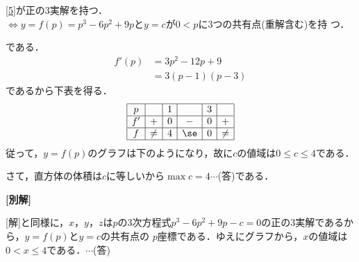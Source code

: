 \documentclass[a4j]{jarticle}
\begin{document}
\begin{multicols}{2}
\begin{enumerate}[(i)]
\begin{center}
          \eqref{5}が正の$3$実解を持つ．\\
          $\Longleftrightarrow$$y=f(p)=p^3-6p^2+9p$と$y=c$が$0<p$に$3$つの共有点(重解含む)を持
          つ．
          \end{center}
     である．
          \begin{align*}
          f'(p)&=3p^2-12p+9  \\
          &=3(p-1)(p-3)
          \end{align*}
     であるから下表を得る．
          \begin{align*}
               \begin{array}{|c|c|c|c|c|c|}  \hline
               p &    &  1  &      &  3  &     \\ \hline
               f' &+  &  0  & -    &  0  & +  \\ \hline     
               f &\ne&  4  &\se &  0  &\ne  \\ \hline
               \end{array}
          \end{align*}
     従って，$y=f(p)$のグラフは下のようになり，故に$c$の値域は$0\le c\le4$である．
          \begin{center}
          \scalebox{1}{}
          \end{center}
     さて，直方体の体積は$c$に等しいから$\max c=4\cdots$(答)である．     
     \end{enumerate}
     
\vspace{3zh}
{\bf[別解]} 

[解]と同様に，$x$，$y$，$z$は$p$の$3$次方程式$p^3-6p^2+9p-c=0$の正の$3$実解であるから，$y=f(p)$と$y=c$の共有点の
$p$座標である．ゆえにグラフから，$x$の値域は$0<x\le4$である．$\cdots$(答)    
\newpage
\end{multicols}
\end{document}
